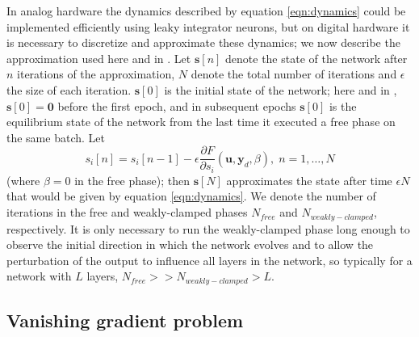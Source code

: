 \documentclass[format=sigconf]{acmart}
\newcommand{\mtx}[1]{\bm{#1}}
\begin{document}
In analog hardware the dynamics described by equation \ref{eqn:dynamics} could be implemented efficiently using leaky integrator neurons, but on digital hardware it is necessary to discretize and approximate these dynamics; we now describe the approximation used here and in \cite{scellier17}. Let $\mtx{s}[n]$ denote the state of the network after $n$ iterations of the approximation, $N$ denote the total number of iterations and $\epsilon$ the size of each iteration. $\mtx{s}[0]$ is the initial state of the network; here and in \cite{scellier17}, $\mtx{s}[0]=\mtx{0}$ before the first epoch, and in subsequent epochs $\mtx{s}[0]$ is the equilibrium state of the network from the last time it executed a free phase on the same batch. Let 
 \begin{equation}
 s_i[n]=s_i[n-1]-\epsilon \frac{\partial F}{\partial s_i}(\mtx{u},\mtx{y}_d,\beta),\;n=1,\hdots,N
 \end{equation}
(where $\beta=0$ in the free phase); then $\mtx{s}[N]$ approximates the state after time $\epsilon N$ that would be given by equation \ref{eqn:dynamics}.
 We denote the number of iterations in the free and weakly-clamped phases $N_{free}$ and $N_{weakly-clamped}$, respectively. It is only necessary to run the weakly-clamped phase long enough to observe the initial direction in which the network evolves and to allow the perturbation of the output to influence all layers in the network, so typically for a network with $L$ layers, $N_{free}>>N_{weakly-clamped}>L$.

\subsection{Vanishing gradient problem}
\label{sec:vangrad}
\end{document}
